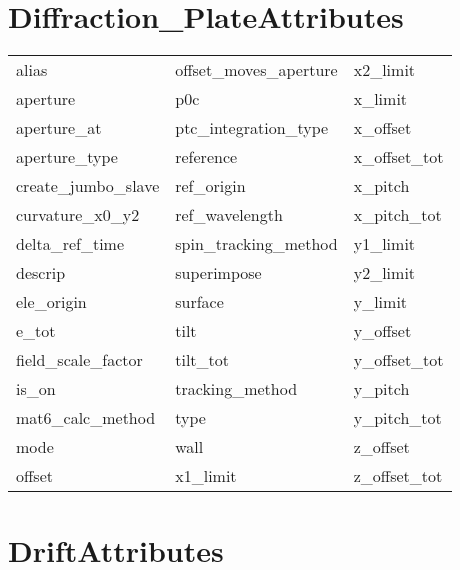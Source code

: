  \section{Diffraction_PlateAttributes}
 \label{s:list.diffraction.plate}
 
 \begin{tabular}{lll} \toprule
alias                       & offset_moves_aperture       & x2_limit                    \\
aperture                    & p0c                         & x_limit                     \\
aperture_at                 & ptc_integration_type        & x_offset                    \\
aperture_type               & reference                   & x_offset_tot                \\
create_jumbo_slave          & ref_origin                  & x_pitch                     \\
curvature_x0_y2             & ref_wavelength              & x_pitch_tot                 \\
delta_ref_time              & spin_tracking_method        & y1_limit                    \\
descrip                     & superimpose                 & y2_limit                    \\
ele_origin                  & surface                     & y_limit                     \\
e_tot                       & tilt                        & y_offset                    \\
field_scale_factor          & tilt_tot                    & y_offset_tot                \\
is_on                       & tracking_method             & y_pitch                     \\
mat6_calc_method            & type                        & y_pitch_tot                 \\
mode                        & wall                        & z_offset                    \\
offset                      & x1_limit                    & z_offset_tot                \\
 \bottomrule
 \end{tabular}
 \vfill
 
 \section{DriftAttributes}
 \label{s:list.drift}
 
